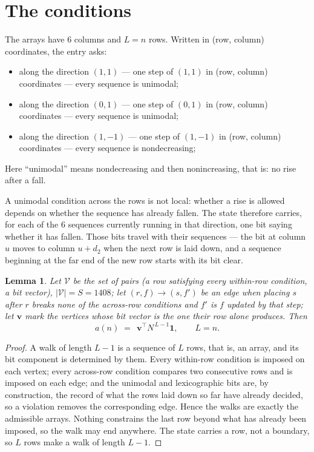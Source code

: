 \documentclass[11pt,a4paper]{article}
\theoremstyle{plain}
\newtheorem{lemma}[theorem]{Lemma}
\theoremstyle{definition}
\begin{document}
\section{The conditions}

The arrays have $6$ columns and $L=n$ rows. Written in (row, column)
coordinates, the entry asks:
\begin{itemize}
\item along the direction $(1,1)$ --- one step of $(1,1)$ in (row, column) coordinates --- every sequence is unimodal;
\item along the direction $(0,1)$ --- one step of $(0,1)$ in (row, column) coordinates --- every sequence is unimodal;
\item along the direction $(1,-1)$ --- one step of $(1,-1)$ in (row, column) coordinates --- every sequence is nondecreasing;
\end{itemize}
Here ``unimodal'' means nondecreasing and then nonincreasing, that is: no rise after a fall.

A unimodal condition across the rows is not local: whether a
rise is allowed depends on whether the sequence has already fallen. The state therefore
carries, for each of the $6$ sequences currently running in that direction, one bit saying
whether it has fallen. Those bits travel with their sequences --- the bit at column $u$
moves to column $u+d_2$ when the next row is laid down, and a sequence beginning at the
far end of the new row starts with its bit clear.

\begin{lemma}\label{lem:walk}
Let $\mathcal V$ be the set of pairs (a row satisfying every within-row condition, a
bit vector), $|\mathcal V|=S=1408$; let $(r,f)\to(s,f')$ be an edge when placing $s$ after $r$
breaks none of the across-row conditions and $f'$ is $f$ updated by that step; let
$\mathbf{v}$ mark the vertices whose bit vector is the one their row alone produces.
Then
\[
a(n)\;=\;\,\mathbf{v}^{\!\top}N^{\,L-1}\mathbf{1},\qquad L=n.
\]
\end{lemma}

\begin{proof}
A walk of length $L-1$ is a sequence of $L$ rows, that is, an array, and its bit component
is determined by them. Every within-row condition is imposed on each vertex; every
across-row condition compares two consecutive rows and is imposed on each edge; and the
unimodal and lexicographic bits are, by construction, the record of what the rows laid down
so far have already decided, so a violation removes the corresponding edge. Hence the walks
are exactly the admissible arrays. Nothing constrains the last row beyond what has already
been imposed, so the walk may end anywhere. The state carries a row, not a boundary, so
$L$ rows make a walk of length $L-1$.
\end{proof}
\end{document}
